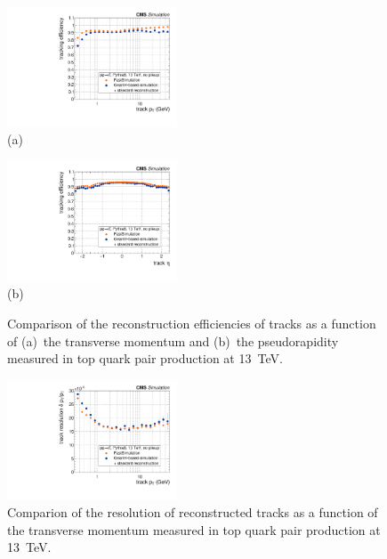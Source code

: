 \documentclass[a4paper]{jpconf}
\begin{document}
\begin{figure}[htbp]
\begin{center}
\parbox{0.46\textwidth}{\centering\includegraphics[width=0.45\textwidth]{figures/eff_pt.pdf}\\(a)}
\hspace{0.05\textwidth}
\parbox{0.46\textwidth}{\centering\includegraphics[width=0.45\textwidth]{figures/eff_eta.pdf}\\(b)}
\caption{\label{fig:eff-tracks}Comparison of the reconstruction efficiencies of tracks as a function of (a)~the transverse momentum and (b)~the pseudorapidity measured in top quark pair production at 13~TeV.}
\end{center}
\end{figure}

\begin{figure}[htbp]
\begin{center}
\includegraphics[width=0.45\textwidth]{figures/res_pt.pdf}
\caption{\label{fig:res-track}Comparion of the resolution of reconstructed tracks as a function of the transverse momentum measured in top quark pair production at 13~TeV.}
\end{center}
\end{figure}
\end{document}

